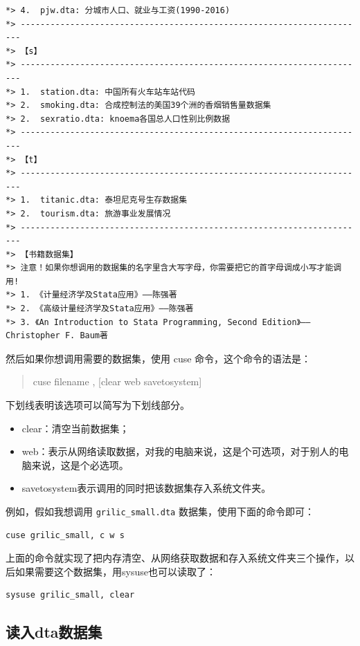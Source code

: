 \documentclass[]{ctexbook}
\providecommand{\tightlist}{%
  \setlength{\itemsep}{0pt}\setlength{\parskip}{0pt}}
\begin{document}
\begin{lstlisting}
*> 4.  pjw.dta: 分城市人口、就业与工资(1990-2016)
*> ----------------------------------------------------------------------
*> 【s】
*> ----------------------------------------------------------------------
*> 1.  station.dta: 中国所有火车站车站代码
*> 2.  smoking.dta: 合成控制法的美国39个洲的香烟销售量数据集
*> 2.  sexratio.dta: knoema各国总人口性别比例数据
*> ----------------------------------------------------------------------
*> 【t】
*> ----------------------------------------------------------------------
*> 1.  titanic.dta: 泰坦尼克号生存数据集
*> 2.  tourism.dta: 旅游事业发展情况
*> ----------------------------------------------------------------------
*> 【书籍数据集】
*> 注意！如果你想调用的数据集的名字里含大写字母，你需要把它的首字母调成小写才能调用!
*> 1. 《计量经济学及Stata应用》——陈强著
*> 2. 《高级计量经济学及Stata应用》——陈强著
*> 3. 《An Introduction to Stata Programming, Second Edition》——Christopher F. Baum著
\end{lstlisting}

然后如果你想调用需要的数据集，使用 cuse 命令，这个命令的语法是：

\begin{quote}
cuse filename , {[}clear web savetosystem{]}
\end{quote}

下划线表明该选项可以简写为下划线部分。

\begin{itemize}
\tightlist
\item
  clear：清空当前数据集；
\item
  web：表示从网络读取数据，对我的电脑来说，这是个可选项，对于别人的电脑来说，这是个必选项。
\item
  savetosystem表示调用的同时把该数据集存入系统文件夹。
\end{itemize}

例如，假如我想调用 \texttt{grilic\_small.dta} 数据集，使用下面的命令即可：

\begin{lstlisting}
cuse grilic_small, c w s
\end{lstlisting}

上面的命令就实现了把内存清空、从网络获取数据和存入系统文件夹三个操作，以后如果需要这个数据集，用sysuse也可以读取了：

\begin{lstlisting}
sysuse grilic_small, clear
\end{lstlisting}

\hypertarget{dta}{%
\subsection{读入dta数据集}\label{dta}}
\end{document}

